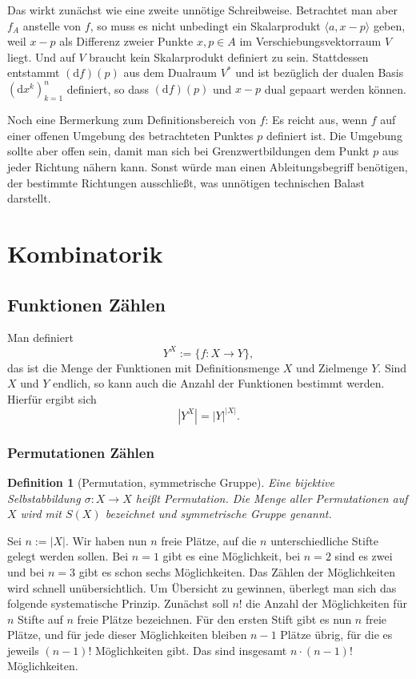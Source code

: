 \documentclass[a4paper,11pt,fleqn,twoside]{scrartcl}
\numberwithin{equation}{section}
\theoremstyle{rmbox}
\newtheorem{Definition}{Definition}
\newcommand{\emdef}[1]{\emph{#1}}
\begin{document}
Das wirkt zunächst wie eine zweite unnötige Schreibweise. Betrachtet
man aber $f_A$ anstelle von $f$, so muss es nicht unbedingt ein
Skalarprodukt $\langle a,x-p\rangle$ geben, weil $x-p$ als
Differenz zweier Punkte $x,p\in A$ im Verschiebungsvektorraum
$V$ liegt. Und auf $V$ braucht kein Skalarprodukt definiert zu sein.
Stattdessen entstammt $(\mathrm df)(p)$ aus dem Dualraum $V^\ast$
und ist bezüglich der dualen Basis $(\mathrm dx^k)_{k=1}^n$ definiert,
so dass $(\mathrm df)(p)$ und $x-p$ dual gepaart werden können.

Noch eine Bermerkung zum Definitionsbereich von $f$: Es reicht aus,
wenn $f$ auf einer offenen Umgebung des betrachteten Punktes $p$
definiert ist. Die Umgebung sollte aber offen sein, damit man sich bei
Grenzwertbildungen dem Punkt $p$ aus jeder Richtung nähern kann.
Sonst würde man einen Ableitungsbegriff benötigen, der bestimmte
Richtungen ausschließt, was unnötigen
technischen Balast darstellt.

\newpage
\section{Kombinatorik}
\subsection{Funktionen Zählen}
Man definiert
\begin{equation}
Y^X := \{f\colon X\to Y\},
\end{equation}
das ist die Menge der Funktionen mit Definitionsmenge $X$ und
Zielmenge $Y$. Sind $X$ und $Y$ endlich, so kann auch die
Anzahl der Funktionen bestimmt werden. Hierfür ergibt sich
\begin{equation}
|Y^X| = |Y|^{|X|}.
\end{equation}

\subsubsection{Permutationen Zählen}
\begin{Definition}[Permutation, symmetrische Gruppe]
Eine bijektive Selbstabbildung $\sigma\colon X\to X$ heißt
\emdef{Permutation}. Die Menge aller Permutationen auf $X$ wird mit
$S(X)$ bezeichnet und \emdef{symmetrische Gruppe} genannt.
\end{Definition}
Sei $n:=|X|$. Wir haben nun $n$ freie Plätze, auf die $n$
unterschiedliche Stifte gelegt werden sollen. Bei $n=1$ gibt es
eine Möglichkeit, bei $n=2$ sind es zwei und bei $n=3$ gibt es schon
sechs Möglichkeiten. Das Zählen der Möglichkeiten wird schnell
unübersichtlich. Um Übersicht zu gewinnen, überlegt man sich das
folgende systematische Prinzip. Zunächst soll $n!$ die Anzahl der
Möglichkeiten für $n$ Stifte auf $n$ freie Plätze bezeichnen.
Für den ersten Stift gibt es nun $n$ freie Plätze, und für jede
dieser Möglichkeiten bleiben $n-1$ Plätze übrig, für die es jeweils
$(n-1)!$ Möglichkeiten gibt. Das sind insgesamt $n\cdot (n-1)!$
Möglichkeiten.
\end{document}
